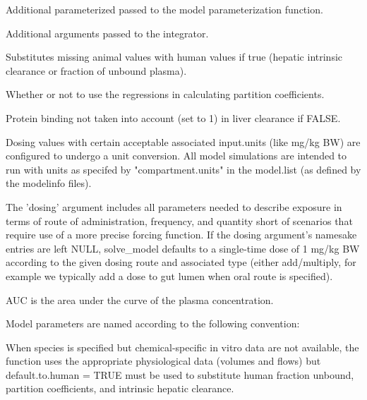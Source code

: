 \documentclass[a4paper]{book}
\begin{document}
\begin{Arguments}
\begin{ldescription}
\item[\code{parameterize.arg.list}] Additional parameterized passed to the model
parameterization function.

\item[\code{...}] Additional arguments passed to the integrator.

\item[\code{default.to.human}] Substitutes missing animal values with human values
if true (hepatic intrinsic clearance or fraction of unbound plasma).

\item[\code{regression}] Whether or not to use the regressions in calculating
partition coefficients.

\item[\code{restrictive.clearance}] Protein binding not taken into account (set to
1) in liver clearance if FALSE.
\end{ldescription}
\end{Arguments}
%
\begin{Details}\relax
Dosing values with certain acceptable associated input.units (like mg/kg BW)
are configured to undergo a unit conversion. All model simulations are 
intended to run with units as specifed by "compartment.units" in the 
model.list (as defined by the modelinfo files).

The 'dosing' argument includes all parameters needed to describe exposure
in terms of route of administration, frequency, and quantity short of 
scenarios that require use of a more precise forcing function. If the dosing
argument's namesake entries are left NULL, solve\_model defaults to a
single-time dose of 1 mg/kg BW according to the given dosing route and 
associated type (either add/multiply, for example we typically add a dose to 
gut lumen 
when oral route is specified).

AUC is the area under the curve of the plasma concentration.

Model parameters are named according to the following convention:


When species is specified but chemical-specific in vitro data are not
available, the function uses the appropriate physiological data (volumes and
flows) but default.to.human = TRUE must be used to substitute human
fraction unbound, partition coefficients, and intrinsic hepatic clearance.
\end{Details}
\end{document}
